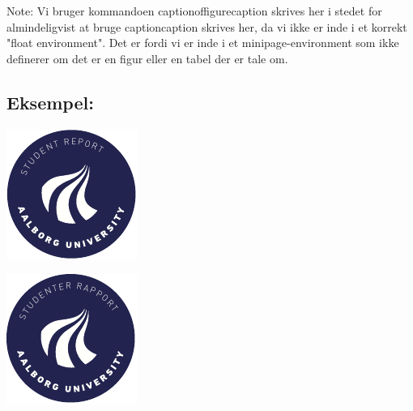 \noindent
Note: Vi bruger kommandoen captionof{figure}{caption skrives her} i stedet for almindeligvist at bruge caption{caption skrives her}, da vi ikke er inde i et korrekt "float environment". Det er fordi vi er inde i et minipage-environment som ikke definerer om det er en figur eller en tabel der er tale om.

\subsection{Eksempel:}
\lipsum[64]
\par
\vspace{1cm}
\noindent %
\begin{minipage}{0.5\textwidth} %
    \centering
    \includegraphics[width=0.65\linewidth]{media/AAUgraphics/aau_logo_circle_en.pdf} 
    \label{fig:aauLogoEN}
\end{minipage}%
%
\begin{minipage}{0.5\textwidth}
    \centering
    \includegraphics[width=0.65\linewidth]{media/AAUgraphics/aau_logo_circle_da.pdf} 
    \label{fig:aauLogoDA}
\end{minipage}

